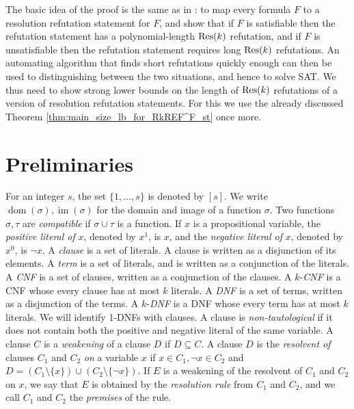 \documentclass[10pt,a4paper]{article}
\theoremstyle{remark}
\newtheorem*{switching lemma}{Switching Lemma}
\newtheorem*{open problem}{Open Problem}
\theoremstyle{definition}
\DeclareMathOperator{\dom}{dom}
\DeclareMathOperator{\im}{im}
\begin{document}
The basic idea of the proof is the same as in \cite{atserias-muller2019-focs}: to map every formula $F$ to a resolution refutation statement for $F$, and show that if $F$ is satisfiable then the refutation statement has a polynomial-length $\textnormal{Res}(k)$ refutation, and if $F$ is unsatisfiable then the refutation statement requires long $\textnormal{Res}(k)$ refutations. An automating algorithm that finds short refutations quickly enough can then be used to distinguishing between the two situations, and hence to solve SAT. We thus need to show strong lower bounds on the length of $\textnormal{Res}(k)$ refutations of a version of resolution refutation statements. For this we use the already discussed Theorem \ref{thm:main_size_lb_for_RkREF^F_st} once more.


\section{Preliminaries}
\label{sec:preliminaries}
For an integer $s$, the set $\{1, \ldots, s\}$ is denoted by $[s]$. 
We write $\dom(\sigma), \im(\sigma)$ for the domain and image of a function $\sigma$.
Two functions $\sigma, \tau$ are \emph{compatible} if $\sigma \cup \tau$ is a function.
If $x$ is a propositional variable, the \emph{positive literal of} $x$, denoted by $x^1$, is $x$, and the \emph{negative literal of} $x$, denoted by $x^0$, is $\neg x$. A \emph{clause} is a set of literals. A clause is written as a disjunction of its elements. A \emph{term} is a set of literals, and is written as a conjunction of the literals. A \emph{CNF} is a set of clauses, written as a conjunction of the clauses. A $k$-\emph{CNF} is a CNF whose every clause has at most $k$ literals. A \emph{DNF} is a set of terms, written as a disjunction of the terms. A $k$-\emph{DNF} is a DNF whose every term has at most $k$ literals. We will identify 1-DNFs with clauses. 
A clause is \emph{non-tautological} if it does not contain both the positive and negative literal of the same variable. A clause $C$ is a \emph{weakening} of a clause $D$ if $D \subseteq C$. A clause $D$ is the \emph{resolvent of} clauses $C_1$ and $C_2$ \emph{on} a variable $x$ if $x \in C_1, \neg x \in C_2$ and $D = (C_1\setminus \{x\}) \cup (C_2 \setminus \{\neg x\})$. If $E$ is a weakening of the resolvent of $C_1$ and $C_2$ on $x$, we say that $E$ is obtained by the \emph{resolution rule} from $C_1$ and $C_2$, and we call $C_1$ and $C_2$ the \emph{premises} of the rule.
\end{document}
